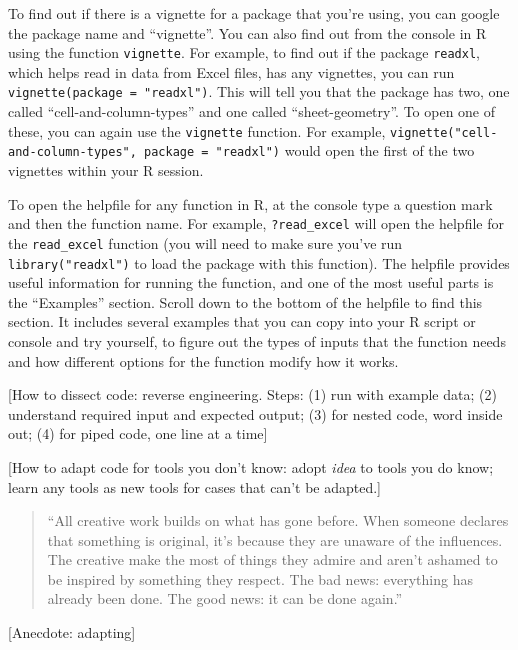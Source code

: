 \documentclass[]{tufte-book}
\begin{document}
To find out if there is a vignette for a package that you're using, you can google the
package name and ``vignette''. You can also find out from the console in R using the
function \texttt{vignette}. For example, to find out if the package \texttt{readxl}, which helps read in
data from Excel files, has any vignettes, you can run \texttt{vignette(package\ =\ "readxl")}.
This will tell you that the package has two, one called ``cell-and-column-types'' and
one called ``sheet-geometry''. To open one of these, you can again use the \texttt{vignette}
function. For example, \texttt{vignette("cell-and-column-types",\ package\ =\ "readxl")} would
open the first of the two vignettes within your R session.

To open the helpfile for any function in R, at the console type a question mark and then
the function name. For example, \texttt{?read\_excel} will open the helpfile for the \texttt{read\_excel}
function (you will need to make sure you've run \texttt{library("readxl")} to load the package
with this function). The helpfile provides useful information for running the function,
and one of the most useful parts is the ``Examples'' section. Scroll down to the bottom
of the helpfile to find this section. It includes several examples that you can copy into
your R script or console and try yourself, to figure out the types of inputs that the
function needs and how different options for the function modify how it works.

{[}How to dissect code: reverse engineering. Steps: (1) run with example
data; (2) understand required input and expected output; (3) for nested code,
word inside out; (4) for piped code, one line at a time{]}

{[}How to adapt code for tools you don't know: adopt \emph{idea} to tools you do know;
learn any tools as new tools for cases that can't be adapted.{]}

\begin{quote}
``All creative work builds on what has gone before. When someone declares
that something is original, it's because they are unaware of the influences.
The creative make the most of things they admire and aren't ashamed to
be inspired by something they respect. The bad news: everything has already
been done. The good news: it can be done again.'' \citep{judkins2016art}
\end{quote}

{[}Anecdote: adapting{]}
\end{document}
